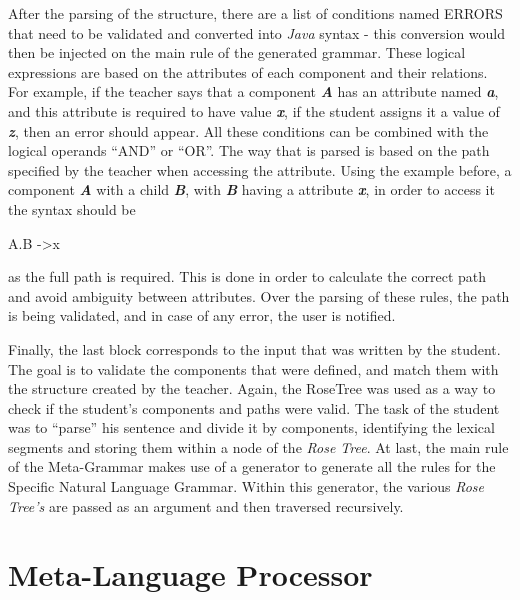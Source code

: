 After the parsing of the structure, there are a list of conditions named ERRORS that need to be validated and converted into \emph{Java} syntax - this conversion would then be injected on the main rule of the generated grammar. These logical expressions are based on the attributes of each component and their relations. For example, if the teacher says that a component \emph{\textbf{A}} has an attribute named \emph{\textbf{a}}, and this attribute is required to have value \emph{\textbf{x}}, if the student assigns it a value of \emph{\textbf{z}}, then an error should appear. All these conditions can be combined with the logical operands ``AND'' or ``OR''. The way that is parsed is based on the path specified by the teacher when accessing the attribute. Using the example before, a component \emph{\textbf{A}} with a child \emph{\textbf{B}}, with \emph{\textbf{B}} having a attribute \emph{\textbf{x}}, in order to access it the syntax should be

A.B -\textgreater x

\noindent as the full path is required. This is done in order to calculate the correct path and avoid ambiguity between attributes. Over the parsing of these rules, the path is being validated, and in case of any error, the user is notified.

Finally, the last block corresponds to the input that was written by the student. 
The goal is to validate the components that were defined, and match them with the structure created by the teacher. 
Again, the RoseTree was used as a way to check if the student’s components and paths were valid. 
The task of the student was to ``parse'' his sentence and divide it by components, identifying the lexical segments and storing them within a node of the \emph{Rose Tree}. 
At last, the main rule of the Meta-Grammar makes use of a generator to generate all the rules for the Specific Natural Language Grammar. 
Within this generator, the various \emph{Rose Tree's} are passed as an argument and then traversed recursively.


\section{Meta-Language Processor}

